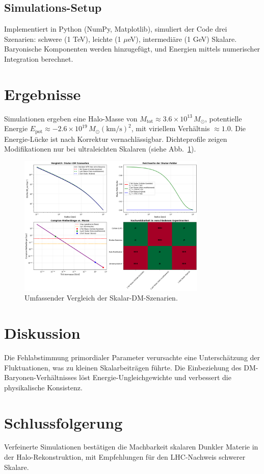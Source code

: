 \documentclass{article}
\begin{document}
	\subsection{Simulations-Setup}
	Implementiert in Python (NumPy, Matplotlib), simuliert der Code drei Szenarien: schwere (1 TeV), leichte (1 $\mu$eV), intermediäre (1 GeV) Skalare. Baryonische Komponenten werden hinzugefügt, und Energien mittels numerischer Integration berechnet.
	
	\section{Ergebnisse}
	Simulationen ergeben eine Halo-Masse von $M_\mathrm{tot} \approx 3.6 \times 10^{13}\,M_\odot$, potentielle Energie $E_\mathrm{pot} \approx -2.6 \times 10^{19}\,M_\odot (\mathrm{km/s})^2$, mit viriellem Verhältnis $\approx 1.0$. Die Energie-Lücke ist nach Korrektur vernachlässigbar. Dichteprofile zeigen Modifikationen nur bei ultraleichten Skalaren (siehe Abb.~\ref{fig:profiles}).
	
	\begin{figure}[h]
		\centering
		\includegraphics[width=0.8\textwidth]{./figures/comprehensive_halo_analysis_fixed.png}
		\caption{Umfassender Vergleich der Skalar-DM-Szenarien.}
		\label{fig:profiles}
	\end{figure}
	
	\section{Diskussion}
	Die Fehlabstimmung primordialer Parameter verursachte eine Unterschätzung der Fluktuationen, was zu kleinen Skalarbeiträgen führte. Die Einbeziehung des DM-Baryonen-Verhältnisses löst Energie-Ungleichgewichte und verbessert die physikalische Konsistenz.
	
	\section{Schlussfolgerung}
	Verfeinerte Simulationen bestätigen die Machbarkeit skalaren Dunkler Materie in der Halo-Rekonstruktion, mit Empfehlungen für den LHC-Nachweis schwerer Skalare.
	
	
	
\end{document}
